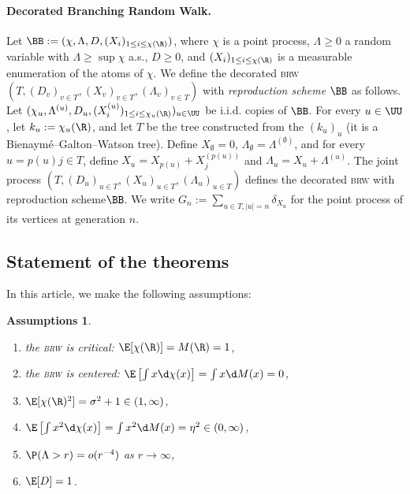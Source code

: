 \documentclass[10pt,a4paper]{article}
\newcommand{\brw}{\textsc{brw}\xspace}
\newtheorem{assumptions}{Assumptions}
\newcommand{\repscheme}{reproduction scheme\xspace}
\begin{document}
\paragraph{Decorated Branching Random Walk.} 
Let $\BB := (\chi, \Lambda, D, (X_i)_{1\leq i \leq \chi(\R)})$, where $\chi$ is a point process, $\Lambda\geq 0$ a random variable with $\Lambda\geq \sup\chi$ a.s., $D\geq 0$, and $(X_i)_{1\leq i \leq \chi(\R)}$ is a measurable enumeration of the atoms of $\chi$.  We define the decorated \brw $(T, (D_v)_{v\in T}, (X_v)_{v\in T}, (\Lambda_v)_{v\in T})$ with \emph{reproduction scheme} $\BB$ as follows. Let $(\chi_u, \Lambda^{(u)}, D_u, (X^{(u)}_i)_{1\leq i \leq \chi_u(\R)})_{u\in\UU}$ be i.i.d. copies of $\BB$. For every $u\in\UU$, let $k_u := \chi_u(\R)$, and let $T$ be the tree constructed from the $(k_u)_u$ (it is a Bienaymé--Galton--Watson tree). Define $X_\emptyset = 0$, $\Lambda_\emptyset = \Lambda^{(\emptyset)}$, and for every $u = p(u) j \in T$, define $X_u = X_{p(u)} + X^{(p(u))}_j$ and $\Lambda_u = X_u + \Lambda^{(u)}$. 
The joint process $(T, (D_u)_{u\in T}, (X_u)_{u\in T}, (\Lambda_u)_{u\in T})$ defines the decorated \brw with \repscheme $\BB$. 
We write $G_n := \sum_{u\in T, |u|=n} \delta_{X_u}$ for the point process of its vertices at generation $n$. 



\subsection{Statement of the theorems}
\label{sec:main-statements}


In this article, we make the following assumptions:

\begin{assumptions}\label{assum}
\begin{enumerate}
\item the \brw is critical: $\E[\chi(\R)] = M(\R) = 1$,
\item the \brw is centered: $\E\left[ \int x \d\chi(x)\right] = \int x \d M(x) = 0$,
\item $\E[\chi(\R)^2] = \sigma^2 + 1 \in (1, \infty)$, 
\item $\E\left[\int x^2 \d\chi(x)\right] = \int x^2 \d M(x) = \eta^2 \in (0, \infty)$,
\item $\P(\Lambda>r) = o(r^{-4})$ as $r\to\infty$, 
\item $\E[D] = 1$. 
\end{enumerate}
\end{assumptions}
\end{document}
